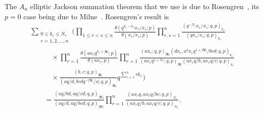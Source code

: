\documentclass[pdftex]{sigma}
\numberwithin{equation}{section}
\newcommand{\sumN}{{\left| \boldsymbol{N} \right|}}
\newcommand\sumk{{\left| \boldsymbol{k} \right|}}
\newcommand{\multsum}[3]{{\sum\limits_{\substack{{0\le #1_#3 \le #2_#3} \\
{#3 =1,2,\dots, n}}}}}
\newcommand{\triprod}[1]{\prod\limits_{1\le r < s \le #1}}
\newcommand{\sqprod}[1]{\prod\limits_{r, s =1}^{#1}} %
\newcommand{\smallprod}[1]{\prod\limits_{r =1}^{#1}} %
\newcommand{\xover}[1]{#1_{r}/#1_{s}}
\newcommand{\ellipticqrfac}[2]{{\left({#1}; q, p\right)_{#2}}} %
\newcommand{\elliptictheta}[1]{\theta \left({#1} ; p\right) }
\newcommand{\ellipticvandermonde}[3]{\triprod{#3} %
\!\! \frac{\elliptictheta{q^{#2_r-#2_s} \xover {#1} }}{\elliptictheta{\xover{#1}}}
}
\begin{document}
The $A_n$ elliptic Jackson summation theorem that we use is due to Rosengren~\cite[Corollary~5.3]{HR2004}, its $p=0$ case being due to Milne~\cite{Milne1988}. Rosengren's result is
\begin{gather}
\multsum{k}{N}{r} \Bigg( \ellipticvandermonde{x}{k}{n}
\sqprod n \frac{\ellipticqrfac{q^{-N_s}\xover{x}}{k_r} }{\ellipticqrfac{q\xover{x}}{k_r} }\nonumber\\
\qquad\quad{}\times
\smallprod n \frac{\elliptictheta{ ax_rq^{k_r+\sumk}}}{\elliptictheta{ax_r}}
\smallprod n \frac{\ellipticqrfac{ax_r}{\sumk}\ellipticqrfac{dx_r, a^2x_rq^{1+\sumN}/bcd}{k_r}}
{\ellipticqrfac{ax_rq^{1+N_r}}{\sumk}\ellipticqrfac{ax_rq/b, ax_rq/c }{k_r}}\nonumber\\
\qquad\quad{} \times
\frac{\ellipticqrfac{b,c}{\sumk}}{\ellipticqrfac{aq/d,bcdq^{-\sumN}/a}{\sumk}}
q^{\sum\limits_{r=1}^n r k_r}\Bigg)\nonumber\\
\qquad{} = \frac{\ellipticqrfac{aq/bd, aq/cd}{\sumN}}{\ellipticqrfac{aq/d, aq/bcd}{\sumN}}
\smallprod n \frac{\ellipticqrfac{a x_rq, a x_r q/bc}{N_r}}{\ellipticqrfac{a x_rq/b, a x_rq/c}{N_r}} .\label{e-8p7-1}
\end{gather}
\end{document}
